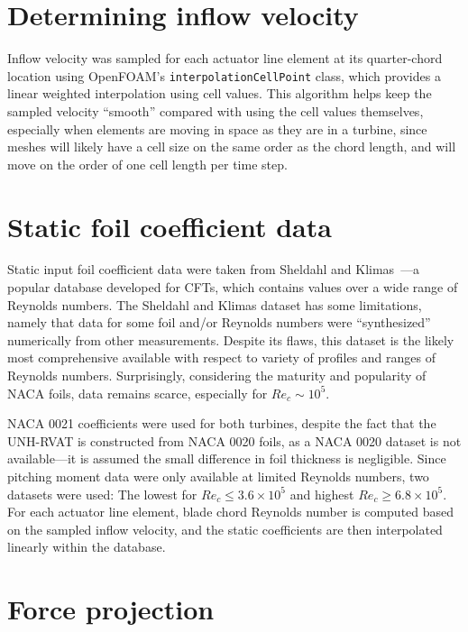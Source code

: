 \documentclass[times]{weauth}
\begin{document}
\section{Determining inflow velocity}

Inflow velocity was sampled for each actuator line element at its quarter-chord
location using OpenFOAM's \texttt{interpolationCellPoint} class, which provides
a linear weighted interpolation using cell values. This algorithm helps keep the
sampled velocity ``smooth'' compared with using the cell values themselves,
especially when elements are moving in space as they are in a turbine, since
meshes will likely have a cell size on the same order as the chord length, and
will move on the order of one cell length per time step.


\section{Static foil coefficient data}

Static input foil coefficient data were taken from Sheldahl and
Klimas~\cite{Sheldahl1981}---a popular database developed for CFTs, which
contains values over a wide range of Reynolds numbers. The Sheldahl and Klimas
dataset has some limitations, namely that data for some foil and/or Reynolds
numbers were ``synthesized'' numerically from other measurements. Despite its
flaws, this dataset is the likely most comprehensive available with respect to
variety of profiles and ranges of Reynolds numbers. Surprisingly, considering
the maturity and popularity of NACA foils, data remains scarce, especially for
$Re_c \sim 10^5$.

NACA 0021 coefficients were used for both turbines, despite the fact that the
UNH-RVAT is constructed from NACA 0020 foils, as a NACA 0020 dataset is not
available---it is assumed the small difference in foil thickness is negligible.
Since pitching moment data were only available at limited Reynolds numbers, two
datasets were used: The lowest for $Re_c \leq 3.6 \times 10^5$ and highest $Re_c
\geq 6.8 \times 10^5$. For each actuator line element, blade chord Reynolds
number is computed based on the sampled inflow velocity, and the static
coefficients are then interpolated linearly within the database.


\section{Force projection}
\end{document}
